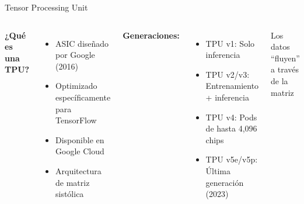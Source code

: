 \documentclass[aspectratio=169]{beamer}
\begin{document}
\begin{frame}{Tensor Processing Unit}
    \begin{columns}
        \textbf{¿Qué es una TPU?}
        \begin{itemize}
            \item ASIC diseñado por Google (2016)
            \item Optimizado específicamente para TensorFlow
            \item Disponible en Google Cloud
            \item Arquitectura de matriz sistólica
        \end{itemize}
        
        \vspace{0.3cm}
        \textbf{Generaciones:}
        \begin{itemize}
            \item TPU v1: Solo inferencia
            \item TPU v2/v3: Entrenamiento + inferencia
            \item TPU v4: Pods de hasta 4,096 chips
            \item TPU v5e/v5p: Última generación (2023)
        \end{itemize}
        
        \centering
        
        \vspace{0.3cm}
        \scriptsize Los datos ``fluyen'' a través de la matriz
    \end{columns}
\end{frame}
\end{document}

